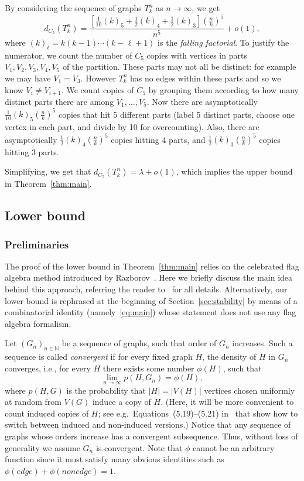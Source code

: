 \documentclass[12pt]{article}
\theoremstyle{definition}
\theoremstyle{remark}
\begin{document}
By considering the sequence of graphs $T_k^n$ as $n\to\infty$, we get
\[
d_{C_5}(T_k^n) = \frac{\left[\frac{1}{10} (k)_5 + \frac12 (k)_4 + \frac 12 (k)_3 \right] \left(\frac nk\right)^5}{n^5} + o(1),
\]
where $(k)_{\ell} = k(k-1)\cdots (k-\ell+1)$ is the \emph{falling factorial}.
To justify the numerator, we count the number of $C_5$ copies with vertices in parts $V_1, V_2, V_3, V_4, V_5$ of the partition. These parts may not all be distinct: for example we may have $V_1 = V_3$. However $T_k^n$ has no edges within these parts and so we know $V_i \neq V_{i+1}$. We count copies of $C_5$ by grouping them according to how many distinct parts there are among $V_1, \ldots, V_5$. Now there are asymptotically $\frac{1}{10} (k)_5 \left(\frac nk\right)^5$ copies that hit 5 different parts (label 5 distinct parts, choose one vertex in each part, and divide by 10 for overcounting). Also, there are  asymptotically $\frac12 (k)_4\left(\frac nk\right)^5$ copies hitting 4 parts, and $\frac12 (k)_3\left(\frac nk\right)^5$ copies hitting 3 parts. 

Simplifying, we get that $d_{C_5}(T_k^n) =\lambda+o(1)$,
which implies the upper bound in Theorem~\ref{thm:main}.


\subsection{Lower bound}\label{sec:lower}

\subsubsection{Preliminaries}

The proof of the lower bound in Theorem~\ref{thm:main} relies on the celebrated flag algebra method introduced by Razborov~\cite{Raz2007}. Here we briefly discuss the main idea behind this approach, referring the reader to~\cite{Raz2007} for all details. Alternatively, our lower bound is rephrased at the beginning of Section~\ref{sec:stability} by means of a combinatorial identity (namely~\eqref{eq:main}) whose statement does not use any flag algebra formalism.

Let $(G_n)_{n\in\mathbb{N}}$ be a sequence of graphs, such that order of $G_n$ increases.
Such a sequence is called \emph{convergent} if for every fixed graph $H$, the density of $H$ in $G_n$ converges, i.e., for every  $H$ there exists some number $\phi(H)$, such that
\[
\lim_{n \to \infty} p(H,G_n) = \phi(H),
\]
where $p(H,G)$ is the probability that $|H|=|V(H)|$ vertices chosen uniformly at random from $V(G)$ induce a copy of $H$. (Here, it will be more convenient to count induced copies of $H$; see e.g.\ Equations~(5.19)--(5.21) in~\cite{Lovasz:lngl}
that show how to switch between induced and non-induced versions.)
Notice that any sequence of graphs whose orders increase has a convergent subsequence. 
Thus, without loss of generality we assume $G_n$ is convergent.
Note that $\phi$ cannot be an arbitrary function since it must satisfy many obvious identities such as $\phi(edge) + \phi(nonedge)=1$.
\end{document}

